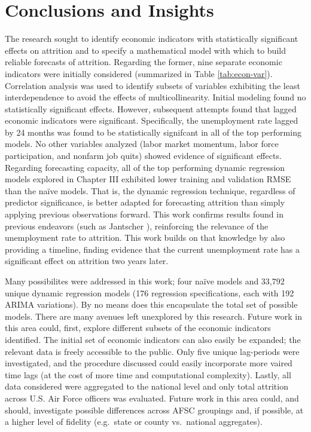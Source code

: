 \documentclass[12pt,letterpaper,toc=flat,oneside]{report}
\theoremstyle{definition}
\theoremstyle{definition}
\theoremstyle{definition}
\theoremstyle{remark}
\begin{document}
\newpage

\hypertarget{conclusions-and-insights}{%
\chapter{Conclusions and Insights}\label{conclusions-and-insights}}

The research sought to identify economic indicators with statistically
significant effects on attrition and to specify a mathematical model
with which to build reliable forecasts of attrition. Regarding the
former, nine separate economic indicators were initially considered
(summarized in Table \ref{tab:econ-var}). Correlation analysis was used
to identify subsets of variables exhibiting the least interdependence to
avoid the effects of multicollinearity. Initial modeling found no
statistically significant effects. However, subsequent attempts found
that lagged economic indicators were significant. Specifically, the
unemployment rate lagged by 24 months was found to be statistically
signifcant in all of the top performing models. No other variables
analyzed (labor market momentum, labor force participation, and nonfarm
job quits) showed evidence of significant effects. Regarding forecasting
capacity, all of the top performing dynamic regression models explored
in Chapter III exhibited lower training and validation RMSE than the
naïve models. That is, the dynamic regression technique, regardless of
predictor significance, is better adapted for forecasting attrition than
simply applying previous observations forward. This work confirms
results found in previous endeavors (such as Jantscher
\cite{jantscher-2016}), reinforcing the relevance of the unemployment
rate to attrition. This work builds on that knowledge by also providing
a timeline, finding evidence that the current unemployment rate has a
significant effect on attrition two years later.

Many possibilites were addressed in this work; four naïve models and
33,792 unique dynamic regression models (176 regression specifications,
each with 192 ARIMA variations). By no means does this encapsulate the
total set of possible models. There are many avenues left unexplored by
this research. Future work in this area could, first, explore different
subsets of the economic indicators identified. The initial set of
economic indicators can also easily be expanded; the relevant data is
freely accessible to the public. Only five unique lag-periods were
investigated, and the procedure discussed could easily incorporate more
vaired time lags (at the cost of more time and computational
complexity). Lastly, all data considered were aggregated to the national
level and only total attrition across U.S. Air Force officers was
evaluated. Future work in this area could, and should, investigate
possible differences across AFSC groupings and, if possible, at a higher
level of fidelity (e.g.~state or county vs.~national aggregates).
\end{document}
